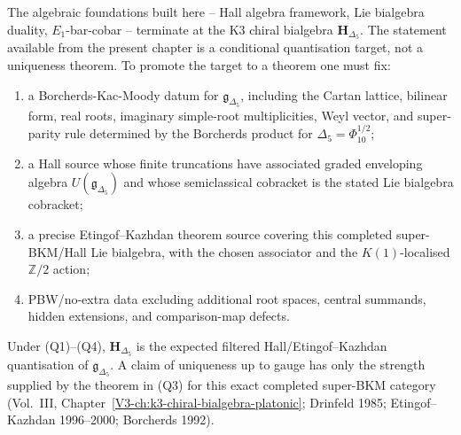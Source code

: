 \begin{remark}
\label{rem:algfnd-1}
The algebraic foundations built here -- Hall algebra framework, Lie
bialgebra duality, $E_1$-bar-cobar -- terminate at the K3
chiral bialgebra $\mathbf H_{\Delta_5}$. The statement available from
the present chapter is a conditional quantisation target, not a
uniqueness theorem. To promote the target to a theorem one must fix:
\begin{enumerate}[label=\textup{(Q\arabic*)}]
\item a Borcherds-Kac-Moody datum for
 $\mathfrak g_{\Delta_5}$, including the Cartan lattice, bilinear
 form, real roots, imaginary simple-root multiplicities, Weyl vector,
 and super-parity rule determined by the Borcherds product for
 $\Delta_5=\Phi_{10}^{1/2}$;
\item a Hall source whose finite truncations have associated graded
 enveloping algebra $U(\mathfrak g_{\Delta_5})$ and whose
 semiclassical cobracket is the stated Lie bialgebra cobracket;
\item a precise Etingof--Kazhdan theorem source covering this
 completed super-BKM/Hall Lie bialgebra, with the chosen associator
 and the $K(1)$-localised $\mathbb Z/2$ action;
\item PBW/no-extra data excluding additional root spaces, central
 summands, hidden extensions, and comparison-map defects.
\end{enumerate}
Under \textup{(Q1)--(Q4)}, $\mathbf H_{\Delta_5}$ is the expected
filtered Hall/Etingof--Kazhdan quantisation of
$\mathfrak g_{\Delta_5}$. A claim of uniqueness up to gauge has only
the strength supplied by the theorem in \textup{(Q3)} for this exact
completed super-BKM category
(Vol.~III, Chapter~\ref{V3-ch:k3-chiral-bialgebra-platonic};
Drinfeld 1985; Etingof--Kazhdan 1996--2000; Borcherds 1992).
\end{remark}
